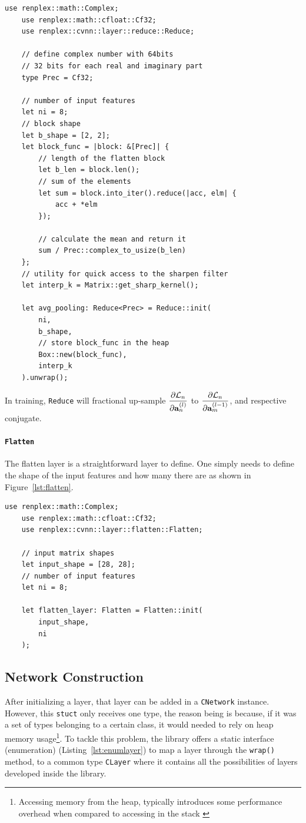 \begin{lstlisting}[label=lst:avg_pool,caption=Initialization of a Mean Pooling layer using the Reduce layer abstraction.]
	use renplex::math::Complex;
	use renplex::math::cfloat::Cf32;
	use renplex::cvnn::layer::reduce::Reduce;
	
	// define complex number with 64bits
	// 32 bits for each real and imaginary part
	type Prec = Cf32;
	
	// number of input features
	let ni = 8;
	// block shape
	let b_shape = [2, 2];
	let block_func = |block: &[Prec]| {
		// length of the flatten block
		let b_len = block.len(); 
		// sum of the elements
		let sum = block.into_iter().reduce(|acc, elm| {
			acc + *elm
		});
		
		// calculate the mean and return it
		sum / Prec::complex_to_usize(b_len)
	};
	// utility for quick access to the sharpen filter
	let interp_k = Matrix::get_sharp_kernel();
	
	let avg_pooling: Reduce<Prec> = Reduce::init(
		ni, 
		b_shape,
		// store block_func in the heap
		Box::new(block_func),
		interp_k
	).unwrap();
\end{lstlisting}

In training, \texttt{Reduce} will fractional up-sample $ \dfrac{\partial \mathcal{L}_n}{\partial \mathbf{a}^{(l)}_{n}} $ to $ \dfrac{\partial \mathcal{L}_n}{\partial \mathbf{a}^{(l-1)}_{m}} $, and respective conjugate.

\paragraph{\texttt{Flatten}}

The flatten layer is a straightforward layer to define. One simply needs to define the shape of the input features and how many there are as shown in Figure~\ref{lst:flatten}.

\begin{lstlisting}[label=lst:flatten, caption=Initialization of a flatten layer.]
	use renplex::math::Complex;
	use renplex::math::cfloat::Cf32;
	use renplex::cvnn::layer::flatten::Flatten;
	
	// input matrix shapes
	let input_shape = [28, 28];
	// number of input features
	let ni = 8;
	
	let flatten_layer: Flatten = Flatten::init(
		input_shape, 
		ni
	);
\end{lstlisting}

\subsection{Network Construction}
After initializing a layer, that layer can be added in a \texttt{CNetwork} instance. However, this \texttt{stuct} only receives one type, the reason being is because, if it was a set of types belonging to a certain class, it would needed to rely on heap memory usage\footnote{Accessing memory from the heap, typically introduces some performance overhead when compared to accessing in the stack \parencite{stroustrup2013cpp}}. To tackle this problem, the library offers a static interface (enumeration) (Listing~\ref{lst:enumlayer}) to map a layer through the \texttt{wrap()} method, to a common type \texttt{CLayer} where it contains all the possibilities of layers developed inside the library.

